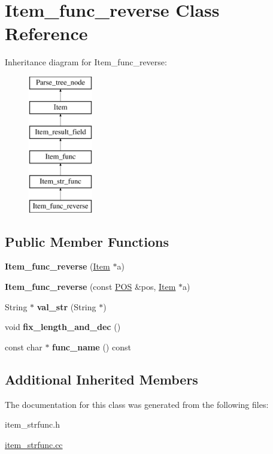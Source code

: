 \hypertarget{classItem__func__reverse}{}\section{Item\+\_\+func\+\_\+reverse Class Reference}
\label{classItem__func__reverse}
Inheritance diagram for Item\+\_\+func\+\_\+reverse\+:\begin{figure}[H]
\begin{center}
\leavevmode
\includegraphics[height=6.000000cm]{classItem__func__reverse}
\end{center}
\end{figure}
\subsection*{Public Member Functions}
\begin{DoxyCompactItemize}
\item 
\mbox{\label{classItem__func__reverse_a105e7da8da3220c919af2ed9fc7debe5}} 
{\bfseries Item\+\_\+func\+\_\+reverse} (\mbox{\hyperlink{classItem}{Item}} $\ast$a)
\item 
\mbox{\label{classItem__func__reverse_a8f686c9688a8d1af7263af67bff09188}} 
{\bfseries Item\+\_\+func\+\_\+reverse} (const \mbox{\hyperlink{structYYLTYPE}{P\+OS}} \&pos, \mbox{\hyperlink{classItem}{Item}} $\ast$a)
\item 
\mbox{\label{classItem__func__reverse_a467018fa9ebe834f288c04d221279a33}} 
String $\ast$ {\bfseries val\+\_\+str} (String $\ast$)
\item 
\mbox{\label{classItem__func__reverse_ac0cc12d953aead631602e4ebb370fb6b}} 
void {\bfseries fix\+\_\+length\+\_\+and\+\_\+dec} ()
\item 
\mbox{\label{classItem__func__reverse_a8168d900744cdfb0f7dec07474312aa7}} 
const char $\ast$ {\bfseries func\+\_\+name} () const
\end{DoxyCompactItemize}
\subsection*{Additional Inherited Members}


The documentation for this class was generated from the following files\+:\begin{DoxyCompactItemize}
\item 
item\+\_\+strfunc.\+h\item 
\mbox{\hyperlink{item__strfunc_8cc}{item\+\_\+strfunc.\+cc}}\end{DoxyCompactItemize}
